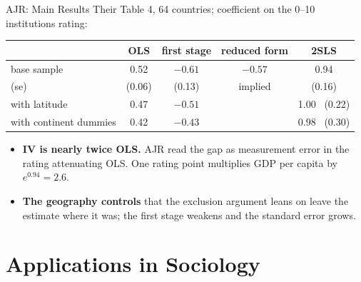 \documentclass[aspectratio=169,11pt,xcolor=dvipsnames]{beamer}
\begin{document}
\begin{frame}{AJR: Main Results}
Their Table 4, 64 countries; coefficient on the 0--10 institutions rating:
\begin{center}\small
\renewcommand{\arraystretch}{1.1}
\begin{tabular}{@{}lcccc@{}}
\toprule
 & OLS & first stage & reduced form & 2SLS \\
\midrule
base sample & 0.52 & $-0.61$ & $-0.57$ & 0.94 \\
(se) & (0.06) & (0.13) & implied & (0.16) \\
with latitude & 0.47 & $-0.51$ & & 1.00 \ (0.22) \\
with continent dummies & 0.42 & $-0.43$ & & 0.98 \ (0.30) \\
\bottomrule
\end{tabular}
\end{center}
\vskip2pt
\begin{itemize}\itemsep2pt
  \item \textbf{IV is nearly twice OLS.} AJR read the gap as measurement
        error in the rating attenuating OLS. One rating point multiplies
        GDP per capita by $e^{0.94} = 2.6$.
  \item \textbf{The geography controls} that the exclusion argument leans on
        leave the estimate where it was; the first stage weakens and the
        standard error grows.
\end{itemize}
\end{frame}

\section[Applications in Sociology]{Applications in Sociology}
\begin{frame}\sectionpage\end{frame}
\end{document}
